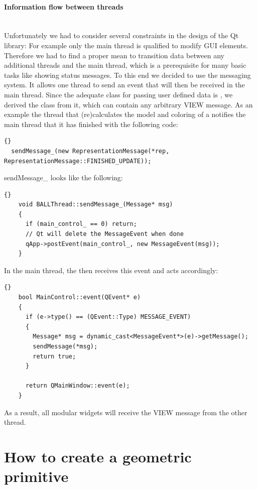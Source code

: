 \paragraph{Information flow between threads}
\hspace*{\fill}\\
Unfortunately we had to consider several constraints in the design of the Qt library: For example only the main thread 
is qualified to modify GUI elements. Therefore we had to find a proper mean to transition data between any additional 
threads and the main thread, which is a prerequisite for many basic tasks like showing status messages.
To this end we decided to use the  messaging system. It allows one thread to send an event that will
then be received in the main thread. Since the adequate class for passing user defined data
is , we derived the class  from it, which can contain any arbitrary VIEW message.
As an example the thread that (re)calculates the model and coloring of a  notifies the main thread
that it has finished with the following code:
\begin{lstlisting}{}
  sendMessage_(new RepresentationMessage(*rep, RepresentationMessage::FINISHED_UPDATE));
\end{lstlisting}
sendMessage\_ looks like the following:
\begin{lstlisting}{}
    void BALLThread::sendMessage_(Message* msg)
    {
      if (main_control_ == 0) return;
      // Qt will delete the MessageEvent when done
      qApp->postEvent(main_control_, new MessageEvent(msg));
    }
\end{lstlisting}

In the main thread, the  then receives this event and acts
accordingly:
\begin{lstlisting}{}
    bool MainControl::event(QEvent* e)
    {
      if (e->type() == (QEvent::Type) MESSAGE_EVENT)
      {
        Message* msg = dynamic_cast<MessageEvent*>(e)->getMessage();
        sendMessage(*msg);
        return true;
      }

      return QMainWindow::event(e);
    }
\end{lstlisting}

As a result, all modular widgets will receive the VIEW message from the other
thread.

\section{How to create a geometric primitive}
\label{section:view_create_a_geometric_primitive}

